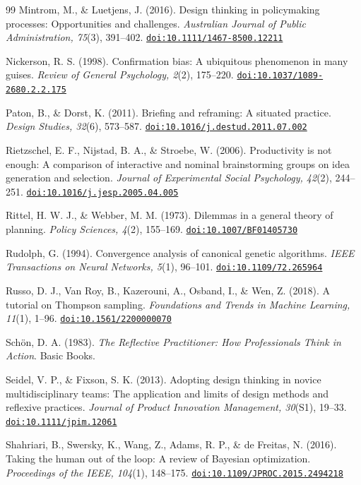 \documentclass[10pt,twocolumn]{article}
\providecommand{\doi}[1]{\href{https://doi.org/#1}{\nolinkurl{doi:#1}}}
\theoremstyle{definition}
\begin{document}
\begin{thebibliography}{99}
 Mintrom, M., \& Luetjens, J. (2016). Design thinking in policymaking processes: Opportunities and challenges. \textit{Australian Journal of Public Administration, 75}(3), 391--402. \doi{10.1111/1467-8500.12211}

 Nickerson, R. S. (1998). Confirmation bias: A ubiquitous phenomenon in many guises. \textit{Review of General Psychology, 2}(2), 175--220. \doi{10.1037/1089-2680.2.2.175}

 Paton, B., \& Dorst, K. (2011). Briefing and reframing: A situated practice. \textit{Design Studies, 32}(6), 573--587. \doi{10.1016/j.destud.2011.07.002}

 Rietzschel, E. F., Nijstad, B. A., \& Stroebe, W. (2006). Productivity is not enough: A comparison of interactive and nominal brainstorming groups on idea generation and selection. \textit{Journal of Experimental Social Psychology, 42}(2), 244--251. \doi{10.1016/j.jesp.2005.04.005}

 Rittel, H. W. J., \& Webber, M. M. (1973). Dilemmas in a general theory of planning. \textit{Policy Sciences, 4}(2), 155--169. \doi{10.1007/BF01405730}

 Rudolph, G. (1994). Convergence analysis of canonical genetic algorithms. \textit{IEEE Transactions on Neural Networks, 5}(1), 96--101. \doi{10.1109/72.265964}

 Russo, D. J., Van Roy, B., Kazerouni, A., Osband, I., \& Wen, Z. (2018). A tutorial on Thompson sampling. \textit{Foundations and Trends in Machine Learning, 11}(1), 1--96. \doi{10.1561/2200000070}

 Sch{\"o}n, D. A. (1983). \textit{The Reflective Practitioner: How Professionals Think in Action}. Basic Books.

 Seidel, V. P., \& Fixson, S. K. (2013). Adopting design thinking in novice multidisciplinary teams: The application and limits of design methods and reflexive practices. \textit{Journal of Product Innovation Management, 30}(S1), 19--33. \doi{10.1111/jpim.12061}

 Shahriari, B., Swersky, K., Wang, Z., Adams, R. P., \& de Freitas, N. (2016). Taking the human out of the loop: A review of Bayesian optimization. \textit{Proceedings of the IEEE, 104}(1), 148--175. \doi{10.1109/JPROC.2015.2494218}


\end{thebibliography}
\end{document}
